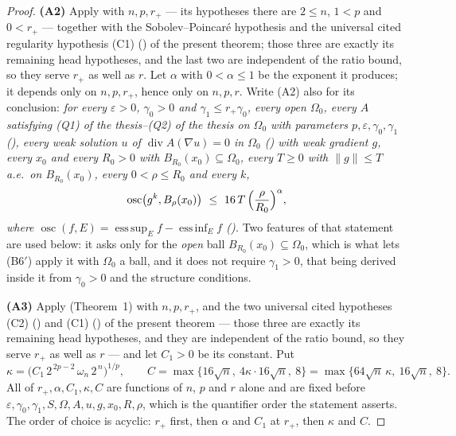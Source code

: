 \begin{proof}
\textbf{(A2)} Apply  with $n,p,r_+$
--- its hypotheses there are $2\le n$, $1<p$ and $0<r_+$ --- together with the
Sobolev--Poincar\'e hypothesis  and the
universal cited regularity hypothesis (C1) () of
the present theorem; those three are exactly its remaining head hypotheses, and
the last two are independent of the ratio bound, so they serve $r_+$ as well as
$r$.  Let $\alpha$ with $0<\alpha\le1$ be the exponent it produces; it depends
only on $n,p,r_+$, hence only on $n,p,r$.  Write (A2) also for its conclusion:
\emph{for every $\varepsilon>0$, $\gamma_0>0$ and $\gamma_1\le r_+\gamma_0$,
every open $\Omega_0$, every $A$ satisfying (Q1) of the thesis--(Q2) of the thesis on
$\Omega_0$ with parameters $p,\varepsilon,\gamma_0,\gamma_1$
(), every weak solution $u$ of
$\operatorname{div}A(\nabla u)=0$ in $\Omega_0$ ()
with weak gradient $g$, every $x_0$ and every $R_0>0$ with
$B_{R_0}(x_0)\subseteq\Omega_0$, every $T\ge0$ with $\|g\|\le T$ a.e.\ on
$B_{R_0}(x_0)$, every $0<\rho\le R_0$ and every $k$,}
\[
\operatorname*{osc}\bigl(g^k,B_\rho(x_0)\bigr)
\ \le\ 16\,T\,\Bigl(\frac\rho{R_0}\Bigr)^{\alpha},
\]
\emph{where $\operatorname*{osc}(f,E)=\operatorname{ess\,sup}_Ef-
\operatorname{ess\,inf}_Ef$ ().}  Two features of that
statement are used below: it asks only for the \emph{open} ball
$B_{R_0}(x_0)\subseteq\Omega_0$, which is what lets (B6$'$) apply it with
$\Omega_0$ a ball, and it does not require $\gamma_1>0$, that being derived
inside it from $\gamma_0>0$ and the structure conditions.

\textbf{(A3)} Apply  (Theorem~1) with $n,p,r_+$,
 and the two universal cited hypotheses (C2)
() and (C1) () of the
present theorem --- those three are exactly its remaining head hypotheses, and
they are independent of the ratio bound, so they serve $r_+$ as well as $r$ ---
and let $C_1>0$ be its constant.  Put
\[
\kappa=\bigl(C_1\,2^{\,2p-2}\,\omega_n\,2^{\,n}\bigr)^{1/p},
\qquad
C=\max\bigl\{16\sqrt n,\ 4\kappa\cdot16\sqrt n,\ 8\bigr\}
=\max\bigl\{64\sqrt n\,\kappa,\ 16\sqrt n,\ 8\bigr\} .
\]
All of $r_+,\alpha,C_1,\kappa,C$ are functions of $n$, $p$ and $r$ alone and
are fixed before $\varepsilon,\gamma_0,\gamma_1,S,\Omega,A,u,g,x_0,R,\rho$,
which is the quantifier order the statement asserts.  The order of choice is
acyclic: $r_+$ first, then $\alpha$ and $C_1$ at $r_+$, then $\kappa$ and
$C$.


\end{proof}
